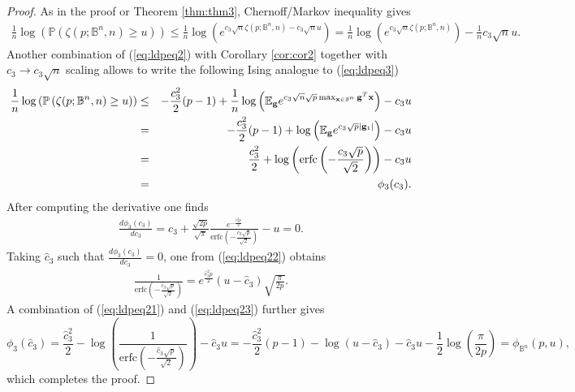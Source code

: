 \documentclass[10pt]{article}
\def\x{{\bf x}}
\def\x{{\mathbf x}}
\def\x{{\bf x}}
\def\x{{\bf x}}
\def\g{{\bf g}}
\def\erfc{\mbox{erfc}}
\def\mE{{\mathbb E}}
\def\mB{{\mathbb B}}
\def\mP{{\mathbb P}}
\def\lp{\left (}
\def\rp{\right )}
\def\x{{\bf x}}
\def\x{{\mathbf x}}
\def\x{{\bf x}}
\def\x{{\bf x}}
\def\g{{\bf g}}
\begin{document}
\begin{proof}
As in the proof or Theorem \ref{thm:thm3},  Chernoff/Markov inequality gives
 \begin{eqnarray}
 \label{eq:ldpeq20}
\frac{1}{n}\log \lp  \mP \lp \zeta(p;\mB^n,n) \geq u \rp \rp
 \leq  \frac{1}{n} \log \lp e^{c_3 \sqrt{n} \zeta(p;\mB^n,n) -c_3\sqrt{n} u} \rp
 =  \frac{1}{n} \log \lp e^{c_3 \sqrt{n} \zeta(p;\mB^n,n) } \rp -\frac{1}{n}c_3\sqrt{n} u .
  \end{eqnarray}
Another combination of (\ref{eq:ldpeq2})  with Corollary \ref{cor:cor2} together with $c_3\rightarrow c_3\sqrt{n}$ scaling allows to write the following Ising analogue to (\ref{eq:ldpeq3})
 \begin{eqnarray}
 \label{eq:ldpeq21}
\frac{1}{n}\log \lp  \mP \lp \zeta(p;\mB^n,n) \geq u \rp \rp
& \leq &
 -\frac{c_{3}^2}{2}(p-1)  +  \frac{1}{n}  \log\lp  \mE_{\g} e^{c_{3}\sqrt{n}\sqrt{p}\max_{\x\in\mB^n} \g^T\x } \rp
-c_3 u
\nonumber \\
& = &
  -\frac{c_{3}^2}{2}(p-1)  +   \log\lp  \mE_{\g} e^{c_{3}\sqrt{p} |\g_1|  } \rp
-c_3 u\nonumber \\
& = &
  \frac{c_{3}^2}{2}  +   \log  \lp  \erfc  \lp -\frac{c_3\sqrt{p}}{\sqrt{2}} \rp \rp
-c_3 u
\nonumber \\
& = & \phi_3(c_3).
  \end{eqnarray}
  After computing the derivative one finds
 \begin{eqnarray}
 \label{eq:ldpeq22}
  \frac{d\phi_3(c_3)}{dc_3} = c_3 + \frac{\sqrt{2p}}{\sqrt{\pi}}\frac{e^{-\frac{c_3^2p }{2}}}{ \erfc  \lp -\frac{c_3\sqrt{p}}{\sqrt{2}} \rp }  - u =0 .
  \end{eqnarray}
Taking $\hat{c}_3$ such that $  \frac{d\phi_3(c_3)}{dc_3} =0$, one from (\ref{eq:ldpeq22}) obtains
 \begin{eqnarray}
 \label{eq:ldpeq23}
  \frac{1}{ \erfc  \lp -\frac{\hat{c}_3\sqrt{p}}{\sqrt{2}} \rp }  = e^{\frac{\hat{c}_3^2p}{2}}( u - \hat{c}_3 )\sqrt{\frac{\pi}{2p}}.
  \end{eqnarray}
 A combination of (\ref{eq:ldpeq21}) and  (\ref{eq:ldpeq23}) further gives
 \begin{equation}
 \label{eq:ldpeq24}
  \phi_3(\hat{c}_3)
  =
  \frac{\hat{c}_{3}^2}{2}  -   \log  \lp  \frac{1}{\erfc  \lp -\frac{\hat{c}_3\sqrt{p}}{\sqrt{2}} \rp } \rp
- \hat{c}_3 u
   =
 - \frac{\hat{c}_{3}^2}{2}(p-1)  -   \log  \lp u-\hat{c}_3 \rp
- \hat{c}_3 u -\frac{1}{2}\log\lp \frac{\pi}{2p}\rp
 = \phi_{\mB^n}(p,u),
  \end{equation}
  which completes the proof.
\end{proof}
\end{document}
